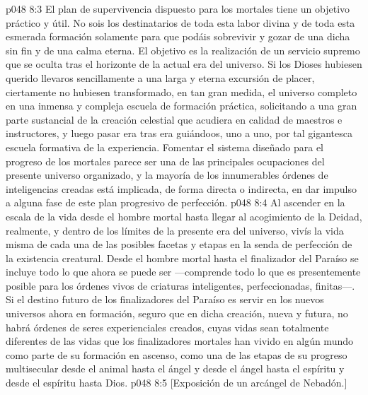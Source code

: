 \vs p048 8:3 El plan de supervivencia dispuesto para los mortales tiene un objetivo práctico y útil. No sois los destinatarios de toda esta labor divina y de toda esta esmerada formación solamente para que podáis sobrevivir y gozar de una dicha sin fin y de una calma eterna. El objetivo es la realización de un servicio supremo que se oculta tras el horizonte de la actual era del universo. Si los Dioses hubiesen querido llevaros sencillamente a una larga y eterna excursión de placer, ciertamente no hubiesen transformado, en tan gran medida, el universo completo en una inmensa y compleja escuela de formación práctica, solicitando a una gran parte sustancial de la creación celestial que acudiera en calidad de maestros e instructores, y luego pasar era tras era guiándoos, uno a uno, por tal gigantesca escuela formativa de la experiencia. Fomentar el sistema diseñado para el progreso de los mortales parece ser una de las principales ocupaciones del presente universo organizado, y la mayoría de los innumerables órdenes de inteligencias creadas está implicada, de forma directa o indirecta, en dar impulso a alguna fase de este plan progresivo de perfección.
\vs p048 8:4 Al ascender en la escala de la vida desde el hombre mortal hasta llegar al acogimiento de la Deidad, realmente, y dentro de los límites de la presente era del universo, vivís la vida misma de cada una de las posibles facetas y etapas en la senda de perfección de la existencia creatural. Desde el hombre mortal hasta el finalizador del Paraíso se incluye todo lo que ahora se puede ser ---comprende todo lo que es presentemente posible para los órdenes vivos de criaturas inteligentes, perfeccionadas, finitas---. Si el destino futuro de los finalizadores del Paraíso es servir en los nuevos universos ahora en formación, seguro que en dicha creación, nueva y futura, no habrá órdenes de seres experienciales creados, cuyas vidas sean totalmente diferentes de las vidas que los finalizadores mortales han vivido en algún mundo como parte de su formación en ascenso, como una de las etapas de su progreso multisecular desde el animal hasta el ángel y desde el ángel hasta el espíritu y desde el espíritu hasta Dios.
\vsetoff
\vs p048 8:5 [Exposición de un arcángel de Nebadón.]
